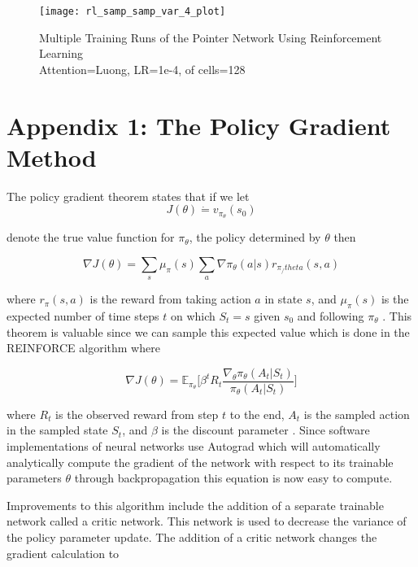 \documentclass[12pt]{article}
\begin{document}
\begin{figure}[H]
  \centering
  \captionsetup{justification=centering}
  \texttt{[image: rl\_samp\_samp\_var\_4\_plot]}
  \caption{Multiple Training Runs of the Pointer Network Using Reinforcement Learning\\ Attention=Luong, LR=1e-4,  of cells=128}
  \label{fig_rl_samp_var_4}
\end{figure}

\section*{Appendix 1: The Policy Gradient Method}

The policy gradient theorem states that if we let
\begin{equation*}
  J(\theta)\dot{=}v_{\pi_{\theta}}(s_0)
\end{equation*}

denote the true value function for $\pi_\theta$, the policy determined by $\theta$ then

\begin{equation*}
  \nabla J(\theta)=\sum_s \mu_\pi(s)\sum_a \nabla \pi_\theta(a|s)r_{\pi_/theta}(s,a)
\end{equation*}

where $r_\pi(s,a)$ is the reward from taking action $a$ in state $s$, and $\mu_\pi(s)$ is the expected number of time steps $t$ on which $S_t=s$ given $s_0$ and following $\pi_\theta$ \citep{1998_Sutton}. This theorem is valuable since we can sample this expected value which is done in the REINFORCE algorithm where

\begin{equation*}
  \nabla J(\theta)=\mathbb{E}_{\pi_\theta}\bigg[ \beta^tR_t\frac{\nabla_\theta\pi_\theta(A_t|S_t)}{\pi_\theta(A_t|S_t)}\bigg]
\end{equation*}

where $R_t$ is the observed reward from step $t$ to the end, $A_t$ is the sampled action in the sampled state $S_t$, and $\beta$ is the discount parameter \citep{1992_Williams}. Since software implementations of neural networks use Autograd which will automatically analytically compute the gradient of the network with respect to its trainable parameters $\theta$ through backpropagation this equation is now easy to compute.

Improvements to this algorithm include the addition of a separate trainable network called a critic network. This network is used to decrease the variance of the policy parameter update. The addition of a critic network changes the gradient calculation to
\end{document}
